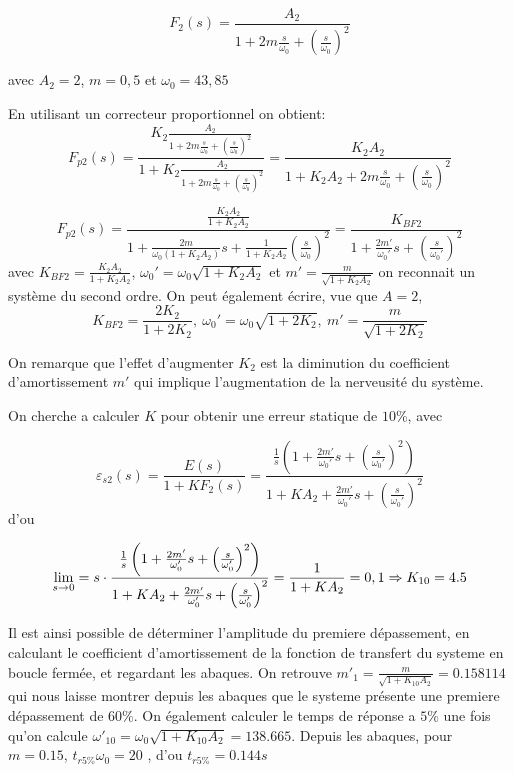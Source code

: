 \documentclass[12pt, a4paper]{report}
\begin{document}
\[
    F_2(s) = \frac{A_2}{1 + 2 m \frac{s}{\omega_0} + \left( \frac{s}{\omega_0}\right)^2}
\]

avec $A_2 = 2$, $m = 0,5$ et $\omega_0 = 43,85$

En utilisant un correcteur proportionnel on obtient:
\[
    F_{p2}(s) = \frac{K_2 \frac{A_2}{1 + 2 m \frac{s}{\omega_0} + \left( \frac{s}{\omega_0}\right)^2}}{1 + K_2 \frac{A_2}{1 + 2 m \frac{s}{\omega_0} + \left( \frac{s}{\omega_0}\right)^2 }} = \frac{K_2 A_2}{1 + K_2A_2 + 2m \frac{s}{\omega_0} + \left( \frac{s}{\omega_0}\right)^2} 
\]

\[
    F_{p2}(s)  = \frac{\frac{K_2A_2}{1 + K_2A_2}}{1 + \frac{2m}{\omega_0(1 + K_2A_2)}s + \frac{1}{1 + K_2A_2} \left( \frac{s}{\omega_0}\right)^2} = \frac{K_{BF2}}{1 + \frac{2m'}{\omega_0'}s + \left( \frac{s}{\omega_0'}\right)^2}
\]
avec $K_{BF2} = \frac{K_2A_2}{1 + K_2A_2}$, $\omega_0' = \omega_0 \sqrt{1 + K_2A_2}$ et $m' = \frac{m}{\sqrt{1 + K_2A_2}}$ on reconnait un système du second ordre. On peut également écrire, vue que $A = 2$,
\[
    K_{BF2} = \frac{2K_2}{1 + 2K_2}, \ \omega_0' = \omega_0 \sqrt{1 + 2K_2},\ m' = \frac{m}{\sqrt{1 + 2K_2}}
\]

On remarque que l'effet d'augmenter $K_2$ est la diminution du coefficient d'amortissement $m'$ qui implique
l'augmentation de la nerveusité du système.

On cherche a calculer $K$ pour obtenir une erreur statique de $10\%$, avec

\[
    \varepsilon_{s2} (s) = \frac{E(s)}{1 + KF_{2}(s)} = \frac{\frac{1}{s}\left(1 + \frac{2m'}{\omega_0'}s + \left( \frac{s}{\omega_0'}\right)^2\right)}{1 + KA_2 + \frac{2m'}{\omega_0'}s + \left( \frac{s}{\omega_0'}\right)^2}
\]
d'ou

$$
    \lim_{s \rightarrow 0} = s \cdot \frac{\frac{1}{s}\left(1 + \frac{2m'}{\omega_0'}s + \left( \frac{s}{\omega_0'}\right)^2\right)}{1 + KA_2 + \frac{2m'}{\omega_0'}s + \left( \frac{s}{\omega_0'}\right)^2} = \frac{1}{1 + KA_2} = 0,1 \Rightarrow K_{10} = 4.5 \\
$$

Il est ainsi possible de déterminer l'amplitude du premiere dépassement, en calculant le coefficient
d'amortissement de la fonction de transfert du systeme en boucle fermée, et regardant les abaques. On retrouve $m'_1 = \frac{m}{\sqrt{1+K_{10}A_2}} = 0.158114$ qui nous laisse montrer depuis les abaques que 
le systeme présente une premiere dépassement de $60\%$. On également calculer le temps de réponse a $5\%$ une fois qu'on calcule $\omega'_{10} = \omega_0 \sqrt{1 + K_{10}A_2} = 138.665$. Depuis les abaques, pour $m = 0.15$, $t_{r5\%}\omega_0 = 20$
, d'ou $t_{r5\%} = 0.144s$
\end{document}
